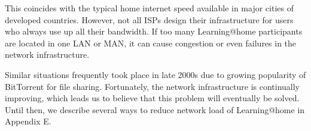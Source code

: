 This coincides with the typical home internet speed available in major cities of developed countries. However, not all ISPs design their infrastructure for users who always use up all their bandwidth. If too many Learning@home participants are located in one LAN or MAN, it can cause congestion or even failures in the network infrastructure. 

Similar situations frequently took place in late 2000s due to growing popularity of BitTorrent for file sharing. Fortunately, the network infrastructure is continually improving, which leads us to believe that this problem will eventually be solved. Until then, we describe several ways to reduce network load of Learning@home in Appendix E.



